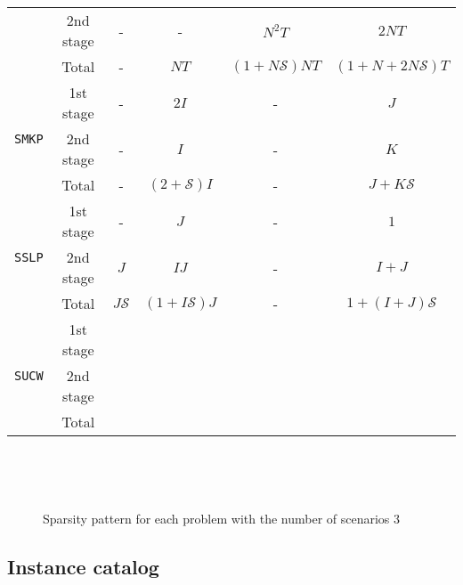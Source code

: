 \begin{table}[H]
{\begin{tabular}{@{}cccccc@{}}
			& 2nd stage & -              & -                                  & $N^2 T$              & $2NT$                     \\ \cmidrule(l){2-6} 
			& Total          & -              & $NT$                               & $(1+N\mathcal{S})NT$ & $(1+N+2N\mathcal{S})T$    \\ \midrule
			\multirow{3}{*}{\texttt{SMKP}}   & 1st stage & -              & $2I$                               & -                    & $J$                       \\
			& 2nd stage & -              & $I$                                & -                    & $K$                       \\ \cmidrule(l){2-6} 
			& Total          & -              & $(2+\mathcal{S})I$                 & -                    & $J+K\mathcal{S}$          \\ \midrule
			\multirow{3}{*}{\texttt{SSLP}}   & 1st stage & -              & $J$                                & -                    & $1$                       \\
			& 2nd stage & $J$            & $IJ$                               & -                    & $I+J$                     \\ \cmidrule(l){2-6} 
			& Total          & $J\mathcal{S}$ & $(1+I\mathcal{S})J$                & -                    & $1+(I+J)\mathcal{S}$      \\ \midrule
			\multirow{3}{*}{\texttt{SUCW}}   & 1st stage &                &                                    &                      &                           \\
			& 2nd stage &                &                                    &                      &                           \\ \cmidrule(l){2-6} 
			& Total          &                &                                    &                      &                           \\ \bottomrule
		\end{tabular}%
	}
\end{table}


\begin{figure}[H]

	\label{fig:sparsity}
\end{figure}

\begin{figure}[H]
	\centering
	~
	
	
	~
	\caption{Sparsity pattern for each problem with the number of scenarios 3}
	\label{fig:sparsity}
\end{figure}
\subsection{Instance catalog}


